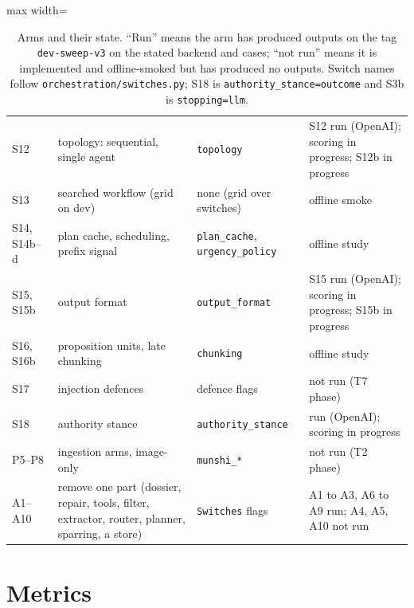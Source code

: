 \begin{table}[H]
\begin{adjustbox}{max width=\textwidth}
\begin{tabular}{@{}lp{5.2cm}p{3.5cm}l@{}}
S12 & topology: sequential, single agent \citep{cemri2025mast} & \texttt{topology} & S12 run (OpenAI); scoring in progress; S12b in progress \\
S13 & searched workflow (grid on dev) & none (grid over switches) & offline smoke \\
S14, S14b--d & plan cache, scheduling, prefix signal \citep{zheng2024sglang} & \texttt{plan\_cache}, \texttt{urgency\_policy} & offline study \\
S15, S15b & output format \citep{tam2024speak} & \texttt{output\_format} & S15 run (OpenAI); scoring in progress; S15b in progress \\
S16, S16b & proposition units, late chunking \citep{chen2024densex} & \texttt{chunking} & offline study \\
S17 & injection defences \citep{beurerkellner2025patterns} & defence flags & not run (T7 phase) \\
S18 & authority stance \citep{wachsmuth2018} & \texttt{authority\_stance} & run (OpenAI); scoring in progress \\
P5--P8 & ingestion arms, image-only \citep{yu2025visrag,faysse2025colpali} & \texttt{munshi\_*} & not run (T2 phase) \\
A1--A10 & remove one part (dossier, repair, tools, filter, extractor, router, planner, sparring, a store) & \texttt{Switches} flags & A1 to A3, A6 to A9 run; A4, A5, A10 not run \\
\bottomrule
\end{tabular}
\end{adjustbox}
\caption{Arms and their state. ``Run'' means the arm has produced outputs on the tag \texttt{dev-sweep-v3} on the stated backend and cases; ``not run'' means it is implemented and offline-smoked but has produced no outputs. Switch names follow \texttt{orchestration/switches.py}; S18 is \texttt{authority\_stance=outcome} and S3b is \texttt{stopping=llm}.}
\end{table}

\section{Metrics}
\label{app:metrics}

